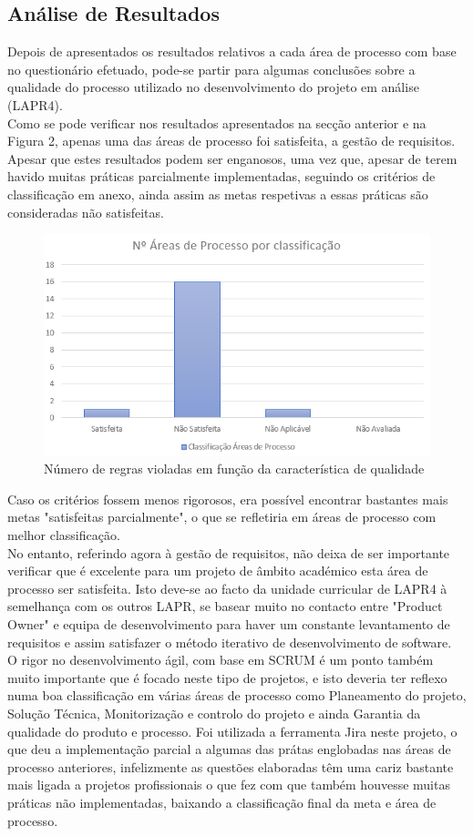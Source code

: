 \documentclass[openany,10pt,a4paper]{article}
\begin{document}
\subsection{Análise de Resultados}
Depois de apresentados os resultados relativos a cada área de processo com base no questionário efetuado, pode-se partir para algumas conclusões sobre a qualidade do processo utilizado no desenvolvimento do projeto em análise (LAPR4). \\
Como se pode verificar nos resultados apresentados na secção anterior e na Figura 2, apenas uma das áreas de processo foi satisfeita, a gestão de requisitos. Apesar que estes resultados podem ser enganosos, uma vez que, apesar de terem havido muitas práticas parcialmente implementadas, seguindo os critérios de classificação em anexo, ainda assim as metas respetivas a essas práticas são consideradas não satisfeitas.\\
\begin{figure}[H]
	\centering
	\includegraphics[width=0.7\linewidth]{graph_results_process.PNG}
	\caption{Número de regras violadas em função da característica de qualidade \small}
	\label{fig_quality}
\end{figure}
Caso os critérios fossem menos rigorosos, era possível encontrar bastantes mais metas "satisfeitas parcialmente", o que se refletiria em áreas de processo com melhor classificação.\\
No entanto, referindo agora à gestão de requisitos, não deixa de ser importante verificar que é excelente para um projeto de âmbito académico esta área de processo ser satisfeita. Isto deve-se ao facto da unidade curricular de LAPR4 à semelhança com os outros LAPR, se basear muito no contacto entre "Product Owner" e equipa de desenvolvimento para haver um constante levantamento de requisitos e assim satisfazer o método iterativo de desenvolvimento de software. \\
O rigor no desenvolvimento ágil, com base em SCRUM é um ponto também muito importante que é focado neste tipo de projetos, e isto deveria ter reflexo numa boa classificação em várias áreas de processo como Planeamento do projeto, Solução Técnica, Monitorização e controlo do projeto e ainda Garantia da qualidade do produto e processo. Foi utilizada a ferramenta Jira neste projeto, o que deu a implementação parcial a algumas das prátas englobadas nas áreas de processo anteriores, infelizmente as questões elaboradas têm uma cariz bastante mais ligada a projetos profissionais o que fez com que também houvesse muitas práticas não implementadas, baixando a classificação final da meta e área de processo.
\end{document}
